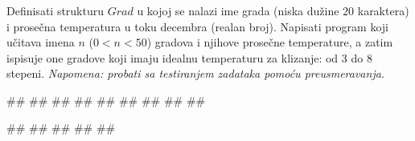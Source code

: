 \begin{Exercise}[label=struc.3] 
Definisati strukturu $Grad$ u kojoj se nalazi ime grada (niska dužine
$20$ karaktera) i prosečna temperatura u toku decembra (realan
broj). Napisati program koji učitava imena $n$ ($0<n<50$) gradova i
njihove prosečne temperature, a zatim ispisuje one gradove koji imaju
idealnu temperaturu za klizanje: od $3$ do $8$
stepeni. \textit{Napomena: probati sa testiranjem zadataka pomoću
  preusmeravanja.}

\begin{maxitest}
\begin{upotreba}{1}
#\naslovInt#
##
##
##
##
##
##
##
##
\end{upotreba}
\end{maxitest}

\begin{maxitest}
\begin{upotreba}{2}
#\naslovInt#
##
##
##
##
\end{upotreba}
\end{maxitest}
 

\end{Exercise}
\begin{Answer}[ref=struc.3]
\end{Answer}


